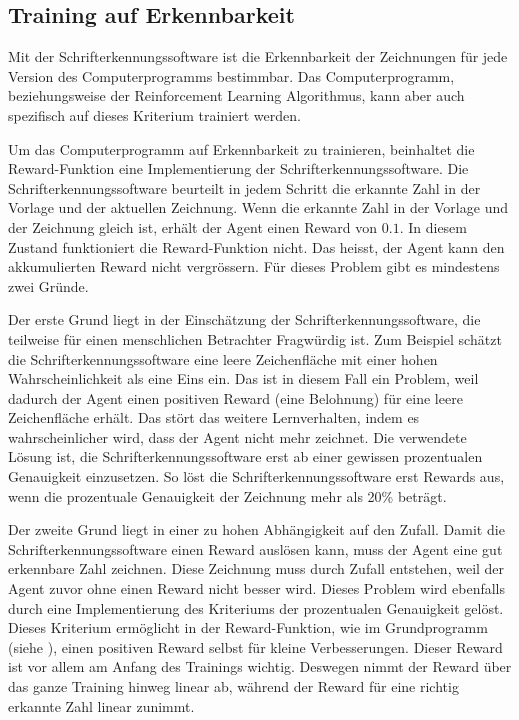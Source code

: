 \subsection{Training auf Erkennbarkeit}
Mit der Schrifterkennungssoftware ist die Erkennbarkeit der Zeichnungen für jede
Version des Computerprogramms bestimmbar. Das Computerprogramm, beziehungsweise
der Reinforcement Learning Algorithmus, kann aber auch spezifisch auf dieses
Kriterium trainiert werden. 

Um das Computerprogramm auf Erkennbarkeit zu trainieren, beinhaltet die
Reward-Funktion eine Implementierung der Schrifterkennungssoftware. Die
Schrifterkennungssoftware beurteilt in jedem Schritt die erkannte Zahl in der
Vorlage und der aktuellen Zeichnung. Wenn die erkannte Zahl in der Vorlage und
der Zeichnung gleich ist, erhält der Agent einen Reward von $0.1$. In diesem
Zustand funktioniert die Reward-Funktion nicht. Das heisst, der Agent kann den
akkumulierten Reward nicht vergrössern. Für dieses Problem gibt es mindestens
zwei Gründe.

Der erste Grund liegt in der Einschätzung der Schrifterkennungssoftware, die
teilweise für einen menschlichen Betrachter Fragwürdig ist. Zum Beispiel schätzt
die Schrifterkennungssoftware eine leere Zeichenfläche mit einer hohen
Wahrscheinlichkeit als eine Eins ein. Das ist in diesem Fall ein Problem, weil
dadurch der Agent einen positiven Reward (eine Belohnung) für eine leere
Zeichenfläche erhält. Das stört das weitere Lernverhalten, indem es
wahrscheinlicher wird, dass der Agent nicht mehr zeichnet. Die verwendete Lösung
ist, die Schrifterkennungssoftware erst ab einer gewissen prozentualen
Genauigkeit einzusetzen. So löst die Schrifterkennungssoftware erst Rewards aus,
wenn die prozentuale Genauigkeit der Zeichnung mehr als 20\% beträgt.

Der zweite Grund liegt in einer zu hohen Abhängigkeit auf den Zufall. Damit die
Schrifterkennungssoftware einen Reward auslösen kann, muss der Agent eine gut
erkennbare Zahl zeichnen. Diese Zeichnung muss durch Zufall entstehen, weil der
Agent zuvor ohne einen Reward nicht besser wird. Dieses Problem wird ebenfalls
durch eine Implementierung des Kriteriums der prozentualen Genauigkeit gelöst.
Dieses Kriterium ermöglicht in der Reward-Funktion, wie im Grundprogramm (siehe
), einen positiven Reward selbst für kleine
Verbesserungen. Dieser Reward ist vor allem am Anfang des Trainings wichtig.
Deswegen nimmt der Reward über das ganze Training hinweg linear ab, während der
Reward für eine richtig erkannte Zahl linear zunimmt.

